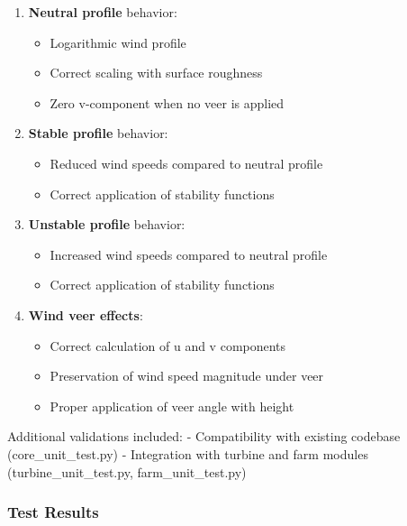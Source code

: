 \documentclass{article}
\begin{document}
\begin{enumerate}[label=\arabic*.]
\item
  \textbf{Neutral profile} behavior:

  \begin{itemize}[label=\textbullet]
  \item
    Logarithmic wind profile
  \item
    Correct scaling with surface roughness
  \item
    Zero v-component when no veer is applied
  \end{itemize}
\item
  \textbf{Stable profile} behavior:

  \begin{itemize}[label=\textbullet]
  \item
    Reduced wind speeds compared to neutral profile
  \item
    Correct application of stability functions
  \end{itemize}
\item
  \textbf{Unstable profile} behavior:

  \begin{itemize}[label=\textbullet]
  \item
    Increased wind speeds compared to neutral profile
  \item
    Correct application of stability functions
  \end{itemize}
\item
  \textbf{Wind veer effects}:

  \begin{itemize}[label=\textbullet]
  \item
    Correct calculation of u and v components
  \item
    Preservation of wind speed magnitude under veer
  \item
    Proper application of veer angle with height
  \end{itemize}
\end{enumerate}

Additional validations included: - Compatibility with existing codebase
(core\_unit\_test.py) - Integration with turbine and farm modules
(turbine\_unit\_test.py, farm\_unit\_test.py)

\hypertarget{test-results}{%
\subsubsection{Test Results}\label{test-results}}
\end{document}
